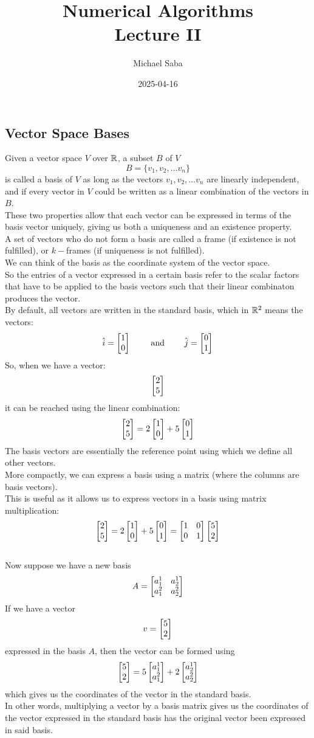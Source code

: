 \documentclass[12pt]{article}
\title{
    \Huge Numerical Algorithms \\
    \Large Lecture II
}
\date{2025-04-16}
\author{Michael Saba}
\begin{document}
\maketitle
\newpage
\setlength{\parindent}{0pt}

\subsection*{Vector Space Bases}

Given a vector space $V$ over $\mathbb{R}$,
a subset $B$ of $V$
\[ B = \{v_1, v_2, \dots v_n \} \]
is called a basis of $V$ as long as the
vectors $v_1, v_2, \dots v_n$
are linearly independent,
and if every vector in $V$ could be written
as a linear combination of the vectors in $B$. \\
These two properties allow that each vector
can be expressed
in terms of the basis vector uniquely,
giving us both a uniqueness
and an existence property. \\

A set of vectors who do not form a basis are
called a frame (if existence is not fulfilled),
or $k-$frames (if uniqueness is not fulfilled). \\

We can think of the basis as the coordinate
system of the vector space. \\
So the entries of a vector expressed in a
certain basis refer to the scalar factors
that have to be applied to the basis vectors
such that their linear combinaton produces
the vector. \\
By default, all vectors are written in the standard
basis, which in $\mathbb{R}^2$ means the vectors:
\[ \hat{i} = \begin{bmatrix} 1 \\ 0 \end{bmatrix} \qquad \text{ and }
\qquad \hat{j} = \begin{bmatrix} 0 \\ 1 \end{bmatrix} \]
So, when we have a vector:
\[ \begin{bmatrix} 2 \\ 5 \end{bmatrix} \]
it can be reached using the linear combination:
\[ \begin{bmatrix} 2 \\ 5 \end{bmatrix} = 2 \begin{bmatrix} 1 \\ 0 \end{bmatrix} + 5 \begin{bmatrix} 0 \\ 1 \end{bmatrix} \]
The basis vectors are essentially the reference
point using which we define all other vectors. \\

More compactly, we can express a basis using
a matrix (where the columns are basis vectors). \\
This is useful as it allows us to express
vectors in a basis using matrix multiplication:
\[ \begin{bmatrix} 2 \\ 5 \end{bmatrix} = 2 \begin{bmatrix} 1 \\ 0 \end{bmatrix} + 5 \begin{bmatrix} 0 \\ 1 \end{bmatrix}
= \begin{bmatrix} 1 & 0 \\ 0 & 1 \end{bmatrix}\begin{bmatrix} 5 \\ 2 \end{bmatrix} \] \\

Now suppose we have a new basis
\[ A = \begin{bmatrix} a_1^1 & a_2^1 \\ a_1^2 & a_2^2 \end{bmatrix} \]
If we have a vector 
\[ v = \begin{bmatrix} 5 \\ 2 \end{bmatrix} \]
expressed in the basis $A$,
then the vector can be formed using
\[ \begin{bmatrix} 5 \\ 2 \end{bmatrix} = 5 \begin{bmatrix} a_1^1 \\ a_1^2 \end{bmatrix}
+ 2 \begin{bmatrix} a_2^1 \\ a_2^2 \end{bmatrix} \]
which gives us the coordinates of the 
vector in the standard basis. \\
In other words, multiplying a vector
by a basis matrix
gives us the coordinates of the vector
expressed in the standard basis
has the original vector been
expressed in said basis. \\
\end{document}
